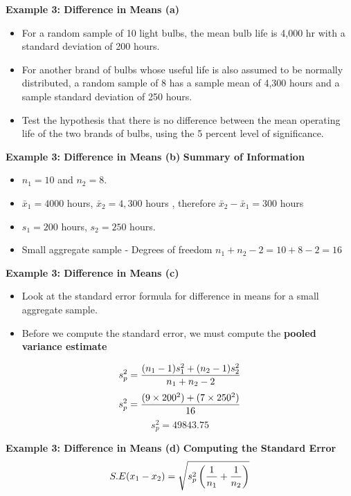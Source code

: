 \noindent \textbf{Example 3: Difference in Means (a) }
\vspace{-1cm}
\begin{itemize}
\item For a random sample of 10 light bulbs, the mean bulb life is 4,000 hr with a standard deviation of 200 hours.
\item For another brand of bulbs whose useful life is also assumed to be normally distributed, a random sample of 8 has a sample mean of 4,300 hours
and a sample standard deviation of 250 hours. \item Test the hypothesis that there is no difference between the
mean operating life of the two brands of bulbs, using the 5 percent level of significance.
\end{itemize}



\noindent \textbf{Example 3: Difference in Means (b) }
\textbf{Summary of Information}
\begin{itemize}\item $n_1 = 10$ and $n_2 = 8$.
\item $\bar{x}_1 = 4000$ hours, $\bar{x}_2 = 4,300 $ hours , therefore  $\bar{x}_2 - \bar{x}_1 = 300$ hours
\item $s_1  = 200$ hours, $s_2 = 250$ hours.
\item Small aggregate sample - Degrees of freedom $n_1 + n_2 - 2 = 10 + 8 - 2 = 16$
\end{itemize}

\noindent \textbf{Example 3: Difference in Means (c) }
\begin{itemize}
\item Look at the standard error formula for difference in means for a small aggregate sample.
\item Before we compute the standard error, we must compute the \textbf{pooled variance estimate}
\end{itemize}
\[ s^2_p = {(n_1 - 1)s^2_1  + (n_2 - 1)s^2_ 2\over n_1 + n_2 - 2 } \]\[s^2_p = {(9 \times 200^2 ) +( 7 \times 250^2) \over 16 }  \]
\[ s^2_p  = 49843.75 \]



\noindent \textbf{Example 3: Difference in Means (d) }
\textbf{Computing the Standard Error}
\[ S.E(x_1 - x_2) = \sqrt{s^2_p \left({1\over n_1}+{1\over n_2} \right)}\]

